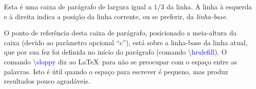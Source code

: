 \documentclass[a4paper,12pt]{article}
\newcommand{\comando}[1]{{\ttfamily\textbackslash\textcolor{blue}{#1}}}
\begin{document}
	
	\tiny
	
	\noindent\hrulefill
	\parbox[c]{0.4\textwidth}{\sloppy Esta é uma caixa de parágrafo de largura igual a $1/3$ da linha. A linha à esquerda e à direita indica a posição da linha corrente, ou se preferir, da \emph{linha-base}.}%
	\hrulefill
	\parbox[c]{0.4\textwidth}{\sloppy O ponto de referência desta caixa de parágrafo, posicionado a meia-altura da caixa (devido ao parâmetro opcional ``c''), está sobre a linha-base da linha atual, que por sua fez foi definida no	início do parágrafo (comando \comando{hrulefill}). O comando \comando{sloppy} diz ao \LaTeX\ para não se preocupar com o espaço entre as palavras. Isto é útil quando o espaço para escrever é pequeno, mas produz resultados pouco agradáveis.}%
	\hrulefill
	
\end{document}
